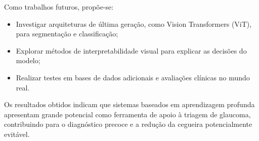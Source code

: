 \documentclass[12pt]{article}
\begin{document}
Como trabalhos futuros, propõe-se:
\begin{itemize}[noitemsep]
    \item Investigar arquiteturas de última geração, como Vision Transformers (ViT), para segmentação e classificação;
    \item Explorar métodos de interpretabilidade visual para explicar as decisões do modelo;
    \item Realizar testes em bases de dados adicionais e avaliações clínicas no mundo real.
\end{itemize}

Os resultados obtidos indicam que sistemas baseados em aprendizagem profunda apresentam grande potencial como ferramenta de apoio à triagem de glaucoma, contribuindo para o diagnóstico precoce e a redução da cegueira potencialmente evitável.







\bigskip


\end{document}
